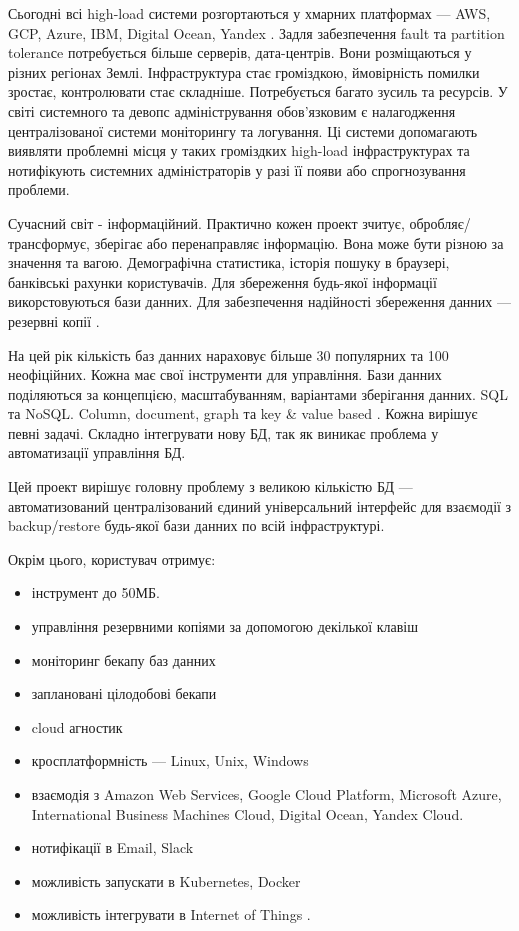 \intro

Сьогодні всі high-load системи розгортаються у хмарних платформах --- AWS, GCP, Azure, IBM, Digital Ocean, Yandex \cite{clouds2017forbes}.
Задля забезпечення fault та partition toleranсe потребується більше серверів, дата-центрів.
Вони розміщаються у різних регіонах Землі. Інфраструктура стає громіздкою, ймовірність помилки зростає,
контролювати стає складніше. Потребується багато зусиль та ресурсів. У світі системного та девопс
адміністрування обов'язковим є налагодження централізованої системи моніторингу та логування.
Ці системи допомагають виявляти проблемні місця у таких громіздких high-load інфраструктурах
та нотифікують системних адміністраторів у разі її появи або спрогнозування проблеми.

Сучасний світ - інформаційний. Практично кожен проект зчитує, обробляє/трансформує, зберігає або перенаправляє інформацію.
Вона може бути різною за значення та вагою. Демографічна статистика, історія пошуку в браузері, банківські рахунки користувачів.
Для збереження будь-якої інформації викорстовуються бази данних. Для забезпечення надійності збереження данних --- резервні копії \cite{sqlserver2012backup}.

На цей рік кількість баз данних нараховує більше 30 популярних \cite{topdb2019list} та 100 неофіційних.
Кожна має свої інструменти для управління. Бази данних поділяються за концепцією, 
масштабуванням, варіантами зберігання данних. SQL та NoSQL. Column, document,
graph та key \& value based \cite{nosql2018features}. Кожна вирішує певні задачі. 
Складно інтегрувати нову БД, так як виникає проблема у автоматизації управління БД.

Цей проект вирішує головну проблему з великою кількістю БД --- автоматизований централізований єдиний універсальний
інтерфейс для взаємодії з backup/restore будь-якої бази данних по всій інфраструктурі.

Окрім цього, користувач отримує:

\begin{itemize}
    \item інструмент до 50МБ.
    \item управління резервними копіями за допомогою декілької клавіш
    \item моніторинг бекапу баз данних
    \item заплановані цілодобові бекапи
    \item cloud агностик \cite{cloudagnostic2012oreilly}
    \item кросплатформність --- Linux, Unix, Windows
    \item взаємодія з Amazon Web Services, Google Cloud Platform, Microsoft Azure, International Business Machines Cloud, Digital Ocean, Yandex Cloud.
    \item нотифікації в Email, Slack
    \item можливість запускати в Kubernetes, Docker
    \item можливість інтегрувати в Internet of Things \cite{iot2015mit}.
\end{itemize}
